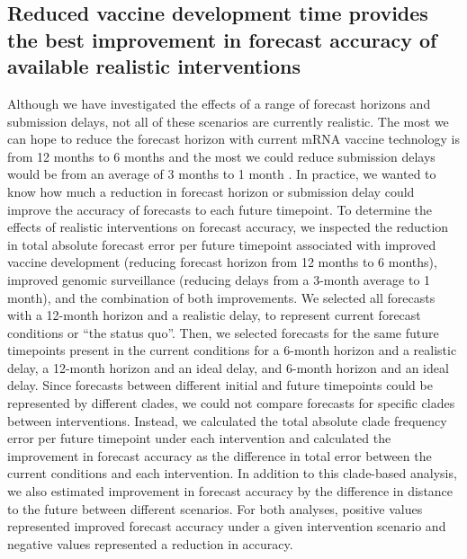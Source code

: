 \documentclass[9pt,lineno]{elife}
\begin{document}
\subsection{Reduced vaccine development time provides the best improvement in forecast accuracy of available realistic interventions}

Although we have investigated the effects of a range of forecast horizons and submission delays, not all of these scenarios are currently realistic.
The most we can hope to reduce the forecast horizon with current mRNA vaccine technology is from 12 months to 6 months and the most we could reduce submission delays would be from an average of 3 months to 1 month \citep{Grant2023}.
In practice, we wanted to know how much a reduction in forecast horizon or submission delay could improve the accuracy of forecasts to each future timepoint.
To determine the effects of realistic interventions on forecast accuracy, we inspected the reduction in total absolute forecast error per future timepoint associated with improved vaccine development (reducing forecast horizon from 12 months to 6 months), improved genomic surveillance (reducing delays from a 3-month average to 1 month), and the combination of both improvements.
We selected all forecasts with a 12-month horizon and a realistic delay, to represent current forecast conditions or ``the status quo''.
Then, we selected forecasts for the same future timepoints present in the current conditions for a 6-month horizon and a realistic delay, a 12-month horizon and an ideal delay, and 6-month horizon and an ideal delay.
Since forecasts between different initial and future timepoints could be represented by different clades, we could not compare forecasts for specific clades between interventions.
Instead, we calculated the total absolute clade frequency error per future timepoint under each intervention and calculated the improvement in forecast accuracy as the difference in total error between the current conditions and each intervention.
In addition to this clade-based analysis, we also estimated improvement in forecast accuracy by the difference in distance to the future between different scenarios.
For both analyses, positive values represented improved forecast accuracy under a given intervention scenario and negative values represented a reduction in accuracy.
\end{document}

